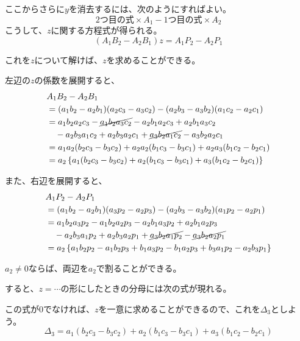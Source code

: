 \documentclass[../../../topic_linear-algebra]{subfiles}
\begin{document}
\br

ここからさらに$y$を消去するには、次のようにすればよい。
\begin{equation*}
  \text{2つ目の式} \times A_1 - \text{1つ目の式} \times A_2
\end{equation*}
こうして、$z$に関する方程式が得られる。
\begin{equation*}
  (A_1 B_2 - A_2 B_1) z = A_1 P_2 - A_2 P_1
\end{equation*}

これを$z$について解けば、$z$を求めることができる。

\br

左辺の$z$の係数を展開すると、
\begin{align*}
  & A_1 B_2 - A_2 B_1 \\
  & = (a_1 b_2 - a_2 b_1)(a_2 c_3 - a_3 c_2) - (a_2 b_3 - a_3 b_2)(a_1 c_2 - a_2 c_1) \\
  & = a_1b_2a_2c_3 - \cancel{a_1b_2a_3c_2} - a_2b_1a_2c_3 + a_2b_1a_3c_2 \\
  & \quad - a_2b_3a_1c_2 + a_2b_3a_2c_1 + \cancel{a_3b_2a_1c_2} - a_3b_2a_2c_1 \\
  &= a_1 a_2 (b_2 c_3 - b_3 c_2)
     + a_2 a_2 (b_1 c_3 - b_3 c_1)
     + a_2 a_3 (b_1 c_2 - b_2 c_1) \\
  &= a_2 \left\{ a_1 (b_2 c_3 - b_3 c_2) + a_2 (b_1 c_3 - b_3 c_1) + a_3 (b_1 c_2 - b_2 c_1) \right\}
\end{align*}

また、右辺を展開すると、
\begin{align*}
  & A_1 P_2 - A_2 P_1 \\
  &= (a_1 b_2 - a_2 b_1)(a_3 p_2 - a_2 p_3) - (a_2 b_3 - a_3 b_2)(a_1 p_2 - a_2 p_1) \\
  &= a_1 b_2 a_3 p_2 - a_1 b_2 a_2 p_3 - a_2 b_1 a_3 p_2 + a_2 b_1 a_2 p_3 \\
  & \quad - a_2 b_3 a_1 p_2 + a_2 b_3 a_2 p_1 + \cancel{a_3 b_2 a_1 p_2} - \cancel{a_3 b_2 a_2 p_1} \\
  &= a_2 \left\{ a_1 b_2 p_2 - a_1 b_2 p_3 + b_1 a_3 p_2 - b_1 a_2 p_3 + b_3 a_1 p_2 - a_2 b_3 p_1 \right\}
\end{align*}

$a_2 \neq 0$ならば、両辺を$a_2$で割ることができる。

\br

すると、$z = \cdots$の形にしたときの分母には次の式が現れる。

この式が$0$でなければ、$z$を一意に求めることができるので、これを$\Delta_3$としよう。
\begin{equation*}
  \Delta_3 = a_1 (b_2 c_3 - b_3 c_2) + a_2 (b_1 c_3 - b_3 c_1) + a_3 (b_1 c_2 - b_2 c_1)
\end{equation*}
\end{document}
